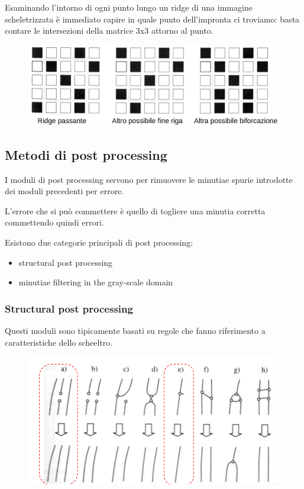 Esaminando l’intorno di ogni punto lungo un ridge
di una immagine scheletrizzata è immediato capire in 
quale punto dell'impronta ci troviamo: basta contare le intersezioni
della matrice 3x3 attorno al punto.

\begin{figure}[ht]
    \centering
    \includegraphics[width=1\linewidth]{chapters/images-chap6/identificazione-minuzie.png}
\end{figure}

\subsection{Metodi di post processing}

I moduli di post processing servono per rimuovere le
minutiae spurie introdotte dei moduli precedenti per errore.

L’errore che si può commettere è quello di togliere una
minutia corretta commettendo quindi errori.

Esistono due categorie principali di post processing:
\begin{itemize}
    \item structural post processing
    \item minutiae filtering in the gray-scale domain
\end{itemize}

\subsubsection{Structural post processing}

Questi moduli sono tipicamente basati su regole che fanno riferimento
a caratteristiche dello scheeltro.

\begin{figure}[ht]
    \centering
    \includegraphics[width=0.75\linewidth]{chapters/images-chap6/structural-post.png}
\end{figure}
